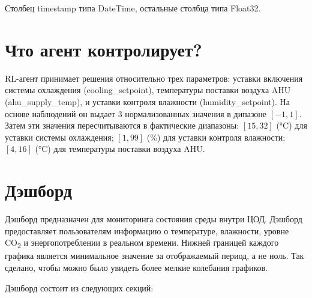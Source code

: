 \documentclass{article}
\begin{document}
Столбец timestamp типа DateTime, остальные столбца типа Float32.

\section*{Что агент контролирует?}

 RL-агент принимает решения относительно трех параметров: уставки включения системы охлаждения (cooling\_setpoint), температуры поставки воздуха AHU (ahu\_supply\_temp), и уставки контроля влажности (humidity\_setpoint). На основе наблюдений он выдает 3 нормализованных значения в дипазоне $[-1, 1]$. Затем эти значения пересчитываются в фактические диапазоны: $[15, 32]$ (°C) для уставки системы охлаждения; $[1, 99]$ (\%) для уставки контроля влажности; $[4, 16]$  (°C) для температуры поставки воздуха AHU.
 
\section*{Дэшборд}
Дэшборд предназначен для мониторинга состояния среды внутри ЦОД. Дэшборд предоставляет пользователям информацию о температуре, влажности, уровне CO\textsubscript{2} и энергопотреблении в реальном времени. Нижней границей каждого графика является минимальное значение за отображаемый период, а не ноль. Так сделано, чтобы можно было увидеть более мелкие колебания графиков.

Дэшборд состоит из следующих секций:
\end{document}

